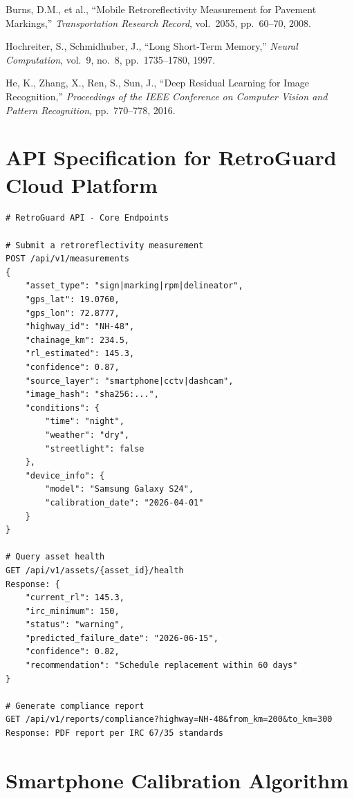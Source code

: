 \documentclass[11pt,a4paper]{article}
\begin{document}
\begin{enumerate}[label={[\arabic*]}, noitemsep, leftmargin=*]
    \item Burns, D.M., et al., ``Mobile Retroreflectivity Measurement for Pavement Markings,'' \textit{Transportation Research Record}, vol.~2055, pp.~60--70, 2008.
    \item Hochreiter, S., Schmidhuber, J., ``Long Short-Term Memory,'' \textit{Neural Computation}, vol.~9, no.~8, pp.~1735--1780, 1997.
    \item He, K., Zhang, X., Ren, S., Sun, J., ``Deep Residual Learning for Image Recognition,'' \textit{Proceedings of the IEEE Conference on Computer Vision and Pattern Recognition}, pp.~770--778, 2016.
\end{enumerate}


\newpage
\appendix

\section{API Specification for RetroGuard Cloud Platform}

\begin{lstlisting}
# RetroGuard API - Core Endpoints

# Submit a retroreflectivity measurement
POST /api/v1/measurements
{
    "asset_type": "sign|marking|rpm|delineator",
    "gps_lat": 19.0760,
    "gps_lon": 72.8777,
    "highway_id": "NH-48",
    "chainage_km": 234.5,
    "rl_estimated": 145.3,
    "confidence": 0.87,
    "source_layer": "smartphone|cctv|dashcam",
    "image_hash": "sha256:...",
    "conditions": {
        "time": "night",
        "weather": "dry",
        "streetlight": false
    },
    "device_info": {
        "model": "Samsung Galaxy S24",
        "calibration_date": "2026-04-01"
    }
}

# Query asset health
GET /api/v1/assets/{asset_id}/health
Response: {
    "current_rl": 145.3,
    "irc_minimum": 150,
    "status": "warning",
    "predicted_failure_date": "2026-06-15",
    "confidence": 0.82,
    "recommendation": "Schedule replacement within 60 days"
}

# Generate compliance report
GET /api/v1/reports/compliance?highway=NH-48&from_km=200&to_km=300
Response: PDF report per IRC 67/35 standards
\end{lstlisting}

\section{Smartphone Calibration Algorithm}
\end{document}
